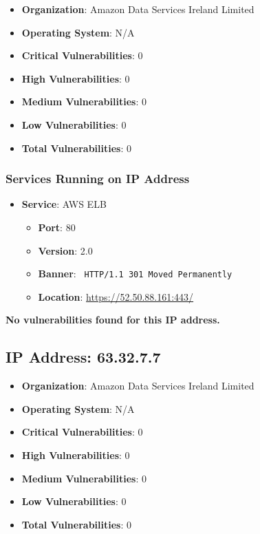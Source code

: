 \documentclass{article}
\begin{document}
\begin{itemize}
    \item \textbf{Organization}: Amazon Data Services Ireland Limited
    \item \textbf{Operating System}:  N/A 
    \item \textbf{Critical Vulnerabilities}: 0
    \item \textbf{High Vulnerabilities}: 0
    \item \textbf{Medium Vulnerabilities}: 0
    \item \textbf{Low Vulnerabilities}: 0
    \item \textbf{Total Vulnerabilities}: 0
\end{itemize}

\subsubsection*{Services Running on IP Address}

\begin{itemize}
    
        \item \textbf{Service}: AWS ELB
        \begin{itemize}
            \item \textbf{Port}: 80
            \item \textbf{Version}:  2.0 
            \item \textbf{Banner}: \texttt{
                HTTP/1.1 301 Moved Permanently
            }
            \item \textbf{Location}: \href{ https://52.50.88.161:443/ }{ https://52.50.88.161:443/ }
        \end{itemize}
    
\end{itemize}


\textbf{No vulnerabilities found for this IP address.}




\clearpage



\subsection*{IP Address: 63.32.7.7}

\begin{itemize}
    \item \textbf{Organization}: Amazon Data Services Ireland Limited
    \item \textbf{Operating System}:  N/A 
    \item \textbf{Critical Vulnerabilities}: 0
    \item \textbf{High Vulnerabilities}: 0
    \item \textbf{Medium Vulnerabilities}: 0
    \item \textbf{Low Vulnerabilities}: 0
    \item \textbf{Total Vulnerabilities}: 0
\end{itemize}
\end{document}
